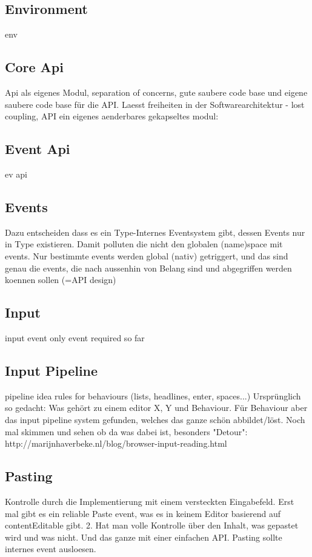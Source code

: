 
\subsection{Environment}
env

\subsection{Core Api}

Api als eigenes Modul, separation of concerns, gute saubere code base und eigene saubere code base für die API. Laesst freiheiten in der Softwarearchitektur - lost coupling, API ein eigenes aenderbares gekapseltes modul:

\subsection{Event Api}
ev api

\subsection{Events}

Dazu entscheiden dass es ein Type-Internes Eventsystem gibt, dessen Events nur in Type existieren. Damit polluten die nicht den globalen (name)space mit events. Nur bestimmte events werden global (nativ) getriggert, und das sind genau die events, die nach aussenhin von Belang sind und abgegriffen werden koennen sollen (=API design)

\subsection{Input}
input event only event required so far

\subsection{Input Pipeline}
pipeline idea
rules for behaviours (lists, headlines, enter, spaces...)
Ursprünglich so gedacht: Was gehört zu einem editor X, Y und Behaviour. Für Behaviour aber das input pipeline system gefunden, welches das ganze schön abbildet/löst.
Noch mal skimmen und sehen ob da was dabei ist, besonders "Detour": http://marijnhaverbeke.nl/blog/browser-input-reading.html

\subsection{Pasting} Kontrolle durch die Implementierung mit einem versteckten Eingabefeld. Erst mal gibt es ein reliable Paste event, was es in keinem Editor basierend auf contentEditable gibt. 2. Hat man volle Kontrolle über den Inhalt, was gepastet wird und was nicht. Und das ganze mit einer einfachen API. Pasting sollte internes event ausloesen.


